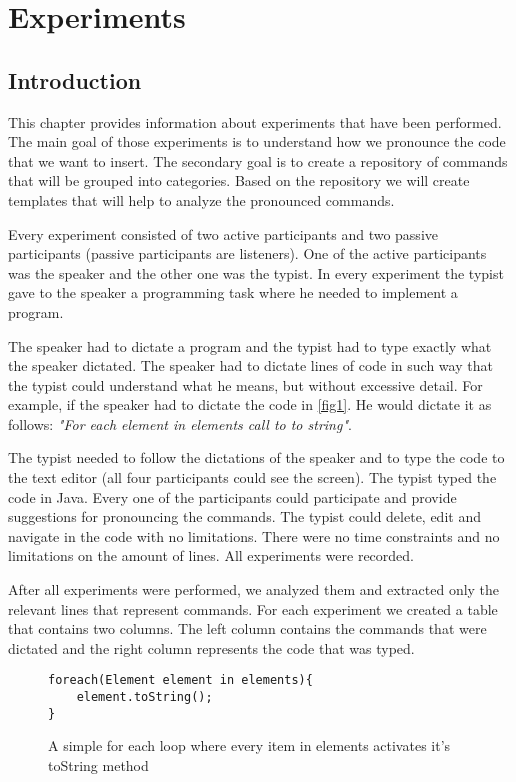 \chapter{Experiments}
\section{Introduction}
This chapter provides information about experiments that have been performed. The main goal of those experiments is to understand how we pronounce the code that we want to insert. The secondary goal is to create a repository of commands that will be grouped into categories. Based on the repository we will create templates that will help to analyze the pronounced commands.

Every experiment consisted of two active participants and two passive participants (passive participants are listeners). One of the active participants was the speaker and the other one was the typist. In every experiment the typist gave to the speaker a programming task where he needed to implement a program. 

The speaker had to dictate a program and the typist had to type exactly what the speaker dictated. The speaker had to dictate lines of code in such way that the typist could understand what he means, but without excessive detail. For example, if the speaker had to dictate the code in \autoref{fig1}. He would dictate it as follows: \textit{"For each element in elements call to to string"}. 

The typist needed to follow the dictations of the speaker and to type the code to the text editor (all four participants could see the screen). The typist typed the code in Java. Every one of the participants could participate and provide suggestions for pronouncing the commands. The typist could delete, edit and navigate in the code with no limitations. There were no time constraints and no limitations on the amount of lines. All experiments were recorded.

After all experiments were performed, we analyzed them and extracted only the relevant lines that represent commands. For each experiment we created a table that contains two columns. The left column contains the commands that were dictated and the right column represents the code that was typed.

\begin{figure}[H]
\begin{lstlisting}
foreach(Element element in elements){
	element.toString();
} 
\end{lstlisting}
\caption{A simple for each loop where every item in elements activates it's toString method}
\label{fig1}
\end{figure}
